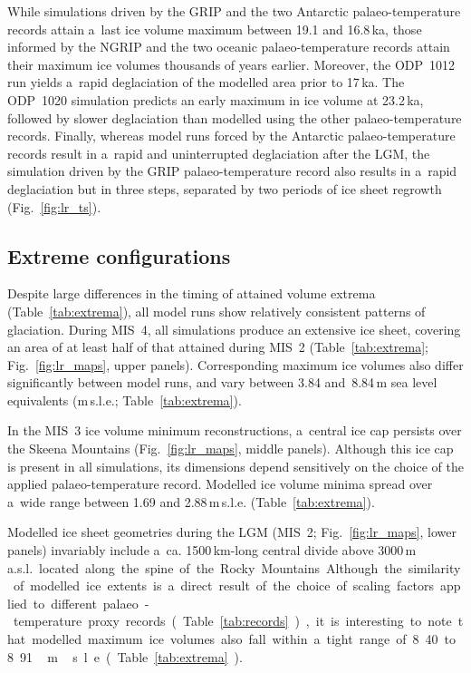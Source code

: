 \documentclass[tc, manuscript]{copernicus}
\begin{document}
      While simulations driven by the GRIP and the two Antarctic
      palaeo-temperature records attain a~last ice volume maximum between
      19.1 and 16.8\,\unit{ka}, those informed by the NGRIP and the two
      oceanic palaeo-temperature records attain their maximum ice volumes
      thousands of years earlier. Moreover, the ODP~1012 run yields a~rapid
      deglaciation of the modelled area prior to 17\,\unit{ka}. The ODP~1020
      simulation predicts an early maximum in ice volume at 23.2\,\unit{ka},
      followed by slower deglaciation than modelled using the other
      palaeo-temperature records. Finally, whereas model runs forced by the
      Antarctic palaeo-temperature records result in a~rapid and
      uninterrupted deglaciation after the LGM, the simulation driven by the
      GRIP palaeo-temperature record also results in a~rapid deglaciation
      but in three steps, separated by two periods of ice sheet regrowth
      (Fig.~\ref{fig:lr_ts}).

\subsection{Extreme configurations}

      Despite large differences in the timing of attained volume extrema
      (Table~\ref{tab:extrema}), all model runs show relatively consistent
      patterns of glaciation. During MIS~4, all simulations produce an
      extensive ice sheet, covering an area of at least half of that
      attained during MIS~2 (Table~\ref{tab:extrema};
      Fig.~\ref{fig:lr_maps}, upper panels). Corresponding maximum ice
      volumes also differ significantly between model runs, and vary between
      3.84 and~8.84\,\unit{m} sea level equivalents (m\,s.l.e.;
      Table~\ref{tab:extrema}).

      In the MIS~3 ice volume minimum reconstructions, a~central ice cap
      persists over the Skeena Mountains (Fig.~\ref{fig:lr_maps}, middle
      panels). Although this ice cap is present in all simulations, its
      dimensions depend sensitively on the choice of the applied
      palaeo-temperature record. Modelled ice volume minima spread over
      a~wide range between 1.69 and 2.88\,\unit{m}\,s.l.e.
      (Table~\ref{tab:extrema}).

      Modelled ice sheet geometries during the LGM (MIS~2;
      Fig.~\ref{fig:lr_maps}, lower panels) invariably include a~ca.
      1500\,\unit{km}-long central divide above 3000\,\unit{m\,a.s.l.}
      located along the spine of the Rocky Mountains. Although the
      similarity of modelled ice extents is a~direct result of the choice of
      scaling factors applied to different palaeo-temperature proxy records
      (Table~\ref{tab:records}), it is interesting to note that modelled
      maximum ice volumes also fall within a~tight range of 8.40 to
      8.91\,\unit{m}\,s.l.e. (Table~\ref{tab:extrema}).
\end{document}

